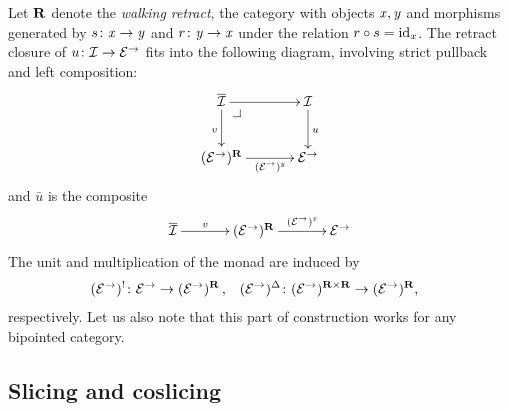 \documentclass[reqno,10pt,a4paper,oneside,draft]{amsart}
\begin{document}
\begin{remark}
Let $\mathbf{R}$ denote the \emph{walking retract}, \ie the category with objects $\mathit{x}, \mathit{y}$ and morphisms generated by $s \colon \mathit{x} \to \mathit{y}$ and $r \colon \mathit{y} \to \mathit{x}$ under the relation $r \mathbin{\circ} s = \operatorname{id}_{\mathit{x}}$.
The retract closure of $u \colon \mathcal{I} \to \mathcal{E}^\to$ fits into the following diagram, involving strict pullback and left composition:
\[
\xymatrix@C+1em{
  \overline{\cal{I}}
  \ar[r]
  \ar[d]_v
  \pullback{dr}
&
  \cal{I}
  \ar[d]^{u}
\\
  (\catE^\to)^{\ret}
  \ar[r]_-{(\catE^\to)^{\retB}}
&
  \catE^\to
}
\]
and $\bar{u}$ is the composite
\[
\xymatrix@C+1em{
  \overline{\cal{I}} \ar[r]^-v &  (\catE^\to)^\ret \ar[r]^-{(\catE^\to)^\retA} & \catE^\to }
\]
The unit and multiplication of the monad are induced by
\[
\begin{aligned}
  (\catE^\to)^{\canonical} &\co \catE^\to \to (\catE^\to)^{\ret}
\, ,&
  (\catE^\to)^{\Delta} &\co (\catE^\to)^{\ret \times \ret} \to (\catE^\to)^{\ret}
\rlap{,}
\end{aligned}
\]
respectively.
Let us also note that this part of construction works for any bipointed category.
\end{remark}

\subsection*{Slicing and coslicing}
\end{document}
